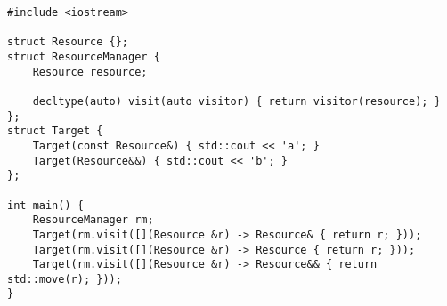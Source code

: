 \begin{lstlisting}[title=\href{https://godbolt.org/z/mKbc-t}{\texttt{godbolt.org/z/mKbc-t}}]
#include <iostream>

struct Resource {};
struct ResourceManager {
    Resource resource;

    decltype(auto) visit(auto visitor) { return visitor(resource); }
};
struct Target {
    Target(const Resource&) { std::cout << 'a'; }
    Target(Resource&&) { std::cout << 'b'; }
};

int main() {
    ResourceManager rm;
    Target(rm.visit([](Resource &r) -> Resource& { return r; }));
    Target(rm.visit([](Resource &r) -> Resource { return r; }));
    Target(rm.visit([](Resource &r) -> Resource&& { return std::move(r); }));
}
\end{lstlisting}
